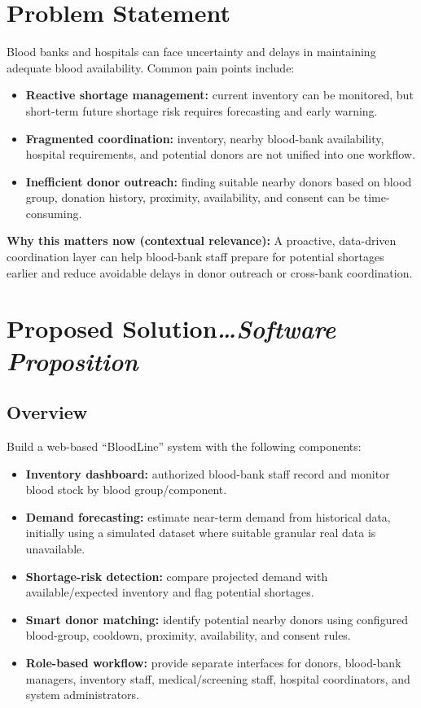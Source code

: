 \documentclass[11pt]{article}
\newcommand{\secnote}[2]{\section{#1\hfill\normalfont\normalsize\itshape #2}}
\begin{document}
\section{Problem Statement}

Blood banks and hospitals can face uncertainty and delays in maintaining adequate blood
availability. Common pain points include:

\begin{itemize}
\item \textbf{Reactive shortage management:} current inventory can be monitored, but short-term
future shortage risk requires forecasting and early warning.
\item \textbf{Fragmented coordination:} inventory, nearby blood-bank availability, hospital requirements, and potential donors are not unified into one workflow.
\item \textbf{Inefficient donor outreach:} finding suitable nearby donors based on blood group, donation history, proximity, availability, and consent can be time-consuming.
\end{itemize}

\textbf{Why this matters now (contextual relevance):} A proactive, data-driven coordination
layer can help blood-bank staff prepare for potential shortages earlier and reduce avoidable
delays in donor outreach or cross-bank coordination.

\secnote{Proposed Solution}{\ldots Software Proposition}

\subsection{Overview}

Build a web-based ``BloodLine'' system with the following components:

\begin{itemize}
\item \textbf{Inventory dashboard:} authorized blood-bank staff record and monitor blood stock by
blood group/component.
\item \textbf{Demand forecasting:} estimate near-term demand from historical data, initially using a
simulated dataset where suitable granular real data is unavailable.
\item \textbf{Shortage-risk detection:} compare projected demand with available/expected inventory
and flag potential shortages.
\item \textbf{Smart donor matching:} identify potential nearby donors using configured blood-group,
cooldown, proximity, availability, and consent rules.
\item \textbf{Role-based workflow:} provide separate interfaces for donors, blood-bank managers, inventory staff, medical/screening staff, hospital coordinators, and system administrators.
\end{itemize}
\end{document}
